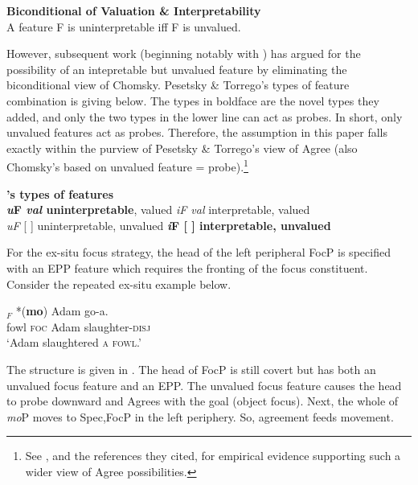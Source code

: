 \documentclass[output=paper,colorlinks,citecolor=brown,draftmode
]{langscibook}
\begin{document}
\ea \label{ex:Aremu:Bicond} \textbf{Biconditional of Valuation \& Interpretability} \citep[5]{chomsky2001derivation}\\
A feature F is uninterpretable iff F is unvalued.
\z

However, subsequent work (beginning notably with \citet{PesetskyTorrego2007}) has argued for the possibility of an intepretable but unvalued feature by eliminating the biconditional view of Chomsky. Pesetsky \& Torrego's types of feature combination is giving below. The types in boldface are the novel types they added, and only the two types in the lower line can act as probes. In short, only unvalued features act as probes. Therefore, the assumption in this paper falls exactly within the purview of Pesetsky \& Torrego's view of Agree (also Chomsky's based on unvalued feature = probe).\footnote{See \citet{PesetskyTorrego2007}, and the references they cited, for empirical evidence supporting such a wider view of Agree possibilities.}


\ea \textbf{\citeauthor{PesetskyTorrego2007}'s \citeyearpar{PesetskyTorrego2007} types of features}\\
\textbf{\textit{u}F \textit{val} uninterpretable}, valued \hspace{0.7cm} \textit{iF val} interpretable, valued\\
\textit{uF} [ ] uninterpretable, unvalued \hspace{0.5cm} \textbf{\textit{i}F [ ] interpretable, unvalued}
\z


For the ex-situ focus strategy, the head of the left peripheral FocP is specified with an EPP feature which requires the fronting of the focus constituent. Consider the repeated ex-situ example below.

\ea \label{ex:Aremu:ExSituObjFocAns}
\gll  [Chworo]$_F$ *(\textbf{mo}) Adam go-a.\\
		fowl \textsc{foc} Adam slaughter-\textsc{disj}\\
\glt 	`Adam slaughtered \textsc{a fowl}.'
\z

\largerpage
The structure is given in . The head of FocP is still covert but has both an unvalued focus feature and an EPP. The unvalued focus feature causes the head to probe downward and Agrees with the goal (object focus). Next, the whole of \textit{mo}P moves to Spec,FocP in the left periphery. So, agreement feeds movement. 
\end{document}
